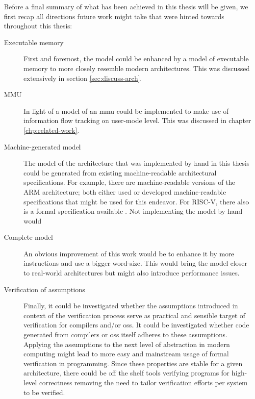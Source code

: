 Before a final summary of what has been achieved in this thesis will be given, we first recap all directions future work might take that were hinted towards throughout this thesis:
\begin{description}
    \item[Executable memory] First and foremost, the model could be enhanced by a model of executable memory to more closely resemble modern architectures.
    This was discussed extensively in section \ref{sec:discuss-arch}.
    \item[MMU] In light of \cite{KhakpourSD13} a model of an \gls{mmu} could be implemented to make use of information flow tracking on user-mode level.
    This was discussed in chapter \ref{chp:related-work}.
    \item[Machine-generated model] The model of the architecture that was implemented by hand in this thesis could be generated from existing machine-readable architectural specifications.
    For example, there are machine-readable versions of the ARM architecture; both \cite{Reid17,Fox02} either used or developed machine-readable specifications that might be used for this endeavor.
    For RISC-V, there also is a formal specification available \cite{RiscvSpecFormal}.
    Not implementing the model by hand would 
    \item[Complete model] An obvious improvement of this work would be to enhance it by more instructions and use a bigger word-size.
    This would bring the model closer to real-world architectures but might also introduce performance issues.
    \item[Verification of assumptions] Finally, it could be investigated whether the assumptions introduced in context of the verification process serve as practical and sensible target of verification for compilers and/or \glspl{os}.
    It could be investigated whether code generated from compilers or \glspl{os} itself adheres to these assumptions.
    Applying the assumptions to the next level of abstraction in modern computing might lead to more easy and mainstream usage of formal verification in programming.
    Since these properties are stable for a given architecture, there could be off the shelf tools verifying programs for high-level correctness removing the need to tailor verification efforts per system to be verified.
\end{description}

